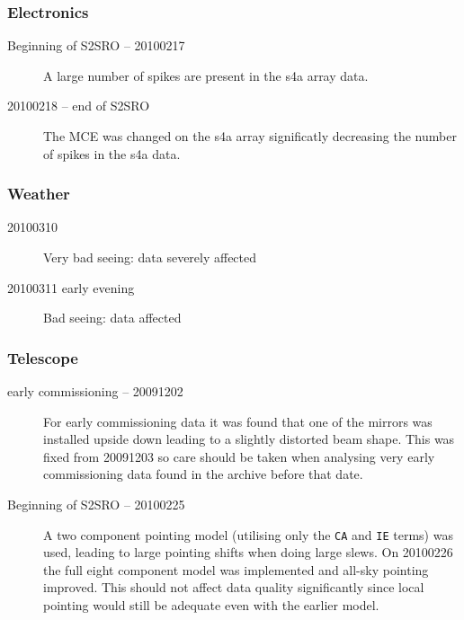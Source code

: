 \documentclass[twoside,11pt]{article}
\renewcommand{\_}{\texttt{\symbol{95}}}
\begin{document}
\subsubsection{Electronics}

\begin{description}

\item[Beginning of S2SRO -- 20100217] \mbox{}

  A large number of spikes are present in the s4a array data.

\item[20100218 -- end of S2SRO] \mbox{}

  The MCE was changed on the s4a array significatly decreasing the
  number of spikes in the s4a data.

\end{description}

\subsubsection{Weather}

\begin{description}

\item[20100310] \mbox{}

  Very bad seeing: data severely affected

\item[20100311 early evening] \mbox{}
  Bad seeing: data affected

\end{description}

\subsubsection{Telescope}

\begin{description}

\item[early commissioning -- 20091202] \mbox{}

  For early commissioning data it was found that one of the mirrors
  was installed upside down leading to a slightly distorted beam
  shape. This was fixed from 20091203 so care should be taken when
  analysing very early commissioning data found in the archive before
  that date.

\item[Beginning of S2SRO -- 20100225] \mbox{}

  A two component pointing model (utilising only the \texttt{CA} and
  \texttt{IE} terms) was used, leading to large pointing shifts when
  doing large slews. On 20100226 the full eight component model was
  implemented and all-sky pointing improved. This should not affect
  data quality significantly since local pointing would still be
  adequate even with the earlier model.

\end{description}
\end{document}
